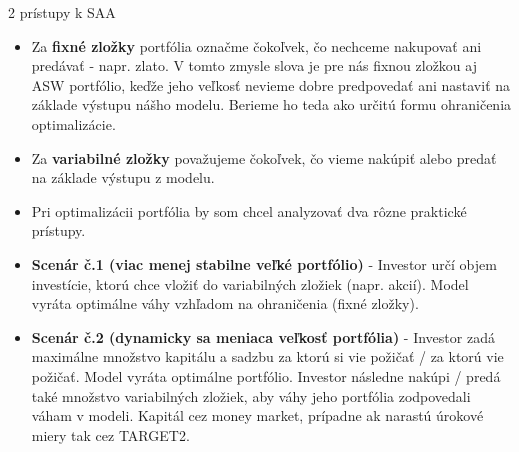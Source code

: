 \documentclass{Bredelebeamer}
\begin{document}
\begin{frame}{2 prístupy k SAA}
	\begin{itemize}
		\item Za\textbf{ fixné zložky} portfólia označme čokoľvek, čo nechceme nakupovať ani predávať - napr. zlato. V tomto zmysle slova je pre nás fixnou zložkou aj ASW portfólio, keďže jeho veľkosť nevieme dobre predpovedať ani nastaviť na základe výstupu nášho modelu. Berieme ho teda ako určitú formu ohraničenia optimalizácie.
		\pause\item Za \textbf{variabilné zložky} považujeme čokoľvek, čo vieme nakúpiť alebo predať na základe výstupu z modelu.
		\pause\item Pri optimalizácii portfólia by som chcel analyzovať dva rôzne praktické prístupy.
		\item \textbf{Scenár č.1 (viac menej stabilne veľké portfólio)} - Investor určí objem investície, ktorú chce vložiť do variabilných zložiek (napr. akcií). Model vyráta optimálne váhy vzhľadom na ohraničenia (fixné zložky).
		\pause\item \textbf{Scenár č.2 (dynamicky sa meniaca veľkosť portfólia)} - Investor zadá maximálne množstvo kapitálu a sadzbu za ktorú si vie požičať / za ktorú vie požičať. Model vyráta optimálne portfólio. Investor následne nakúpi / predá také množstvo variabilných zložiek, aby váhy jeho portfólia zodpovedali váham v modeli. Kapitál cez money market, prípadne ak narastú úrokové miery tak cez TARGET2.
	\end{itemize}
\end{frame}
\end{document}
